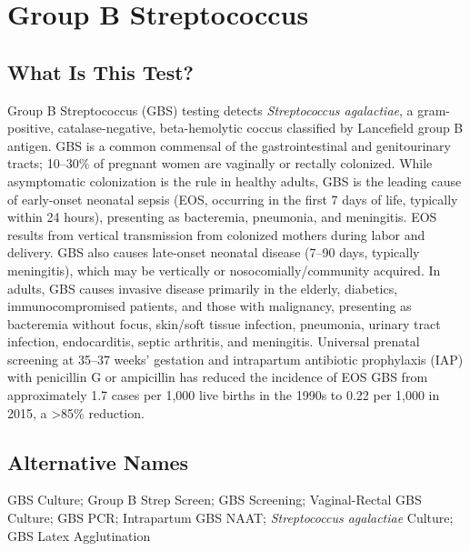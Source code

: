 \chapter{Group B Streptococcus}

\section*{What Is This Test?}
Group B Streptococcus (GBS) testing detects \textit{Streptococcus agalactiae}, a gram-positive, catalase-negative, beta-hemolytic coccus classified by Lancefield group B antigen. GBS is a common commensal of the gastrointestinal and genitourinary tracts; 10--30\% of pregnant women are vaginally or rectally colonized. While asymptomatic colonization is the rule in healthy adults, GBS is the leading cause of early-onset neonatal sepsis (EOS, occurring in the first 7 days of life, typically within 24 hours), presenting as bacteremia, pneumonia, and meningitis. EOS results from vertical transmission from colonized mothers during labor and delivery. GBS also causes late-onset neonatal disease (7--90 days, typically meningitis), which may be vertically or nosocomially/community acquired. In adults, GBS causes invasive disease primarily in the elderly, diabetics, immunocompromised patients, and those with malignancy, presenting as bacteremia without focus, skin/soft tissue infection, pneumonia, urinary tract infection, endocarditis, septic arthritis, and meningitis. Universal prenatal screening at 35--37 weeks' gestation and intrapartum antibiotic prophylaxis (IAP) with penicillin G or ampicillin has reduced the incidence of EOS GBS from approximately 1.7 cases per 1,000 live births in the 1990s to 0.22 per 1,000 in 2015, a >85\% reduction.

\section*{Alternative Names}
GBS Culture; Group B Strep Screen; GBS Screening; Vaginal-Rectal GBS Culture; GBS PCR; Intrapartum GBS NAAT; \textit{Streptococcus agalactiae} Culture; GBS Latex Agglutination

